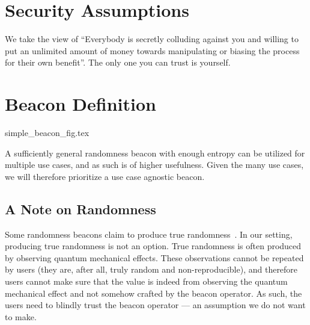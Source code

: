 \section{Security Assumptions}

We take the view of \enquote{Everybody is secretly colluding against you and willing to put an unlimited amount of money towards manipulating or biasing the process for their own benefit}. The only one you can trust is yourself.

\section{Beacon Definition}



{simple_beacon_fig.tex}

A sufficiently general randomness beacon with enough entropy can be utilized for multiple use cases, and as such is of higher usefulness. Given the many use cases, we will therefore prioritize a use case agnostic beacon.

\subsection{A Note on Randomness}
Some randomness beacons claim to produce true randomness~\cite{nistbeacon}. In our setting, producing true randomness is not an option. True randomness is often produced by observing quantum mechanical effects. These observations cannot be repeated by users (they are, after all, truly random and non-reproducible), and therefore users cannot make sure that the value is indeed from observing the quantum mechanical effect and not somehow crafted by the beacon operator. As such, the users need to blindly trust the beacon operator  --- an assumption we do not want to make.


